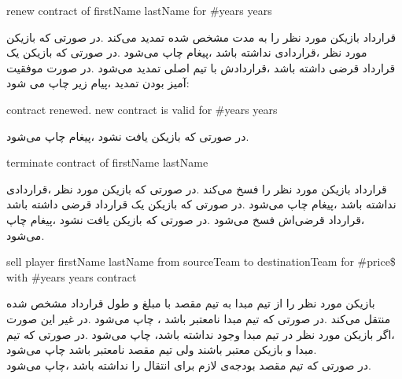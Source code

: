 \documentclass[]{article}
\begin{document}
\begin{tcolorbox}[boxrule=0pt]
	\begin{latin}
		\large{
			renew contract of firstName lastName for \#years years
		}
	\end{latin}
\end{tcolorbox}
ﻗﺮارداد ﺑﺎزﯾﮑﻦ ﻣﻮرد ﻧﻈﺮ را ﺑﻪ ﻣﺪت ﻣﺸﺨﺺ ﺷﺪه ﺗﻤﺪﯾﺪ ﻣﯽﮐﻨﺪ .‬در ﺻﻮرﺗﯽ ﮐﻪ 
ﺑﺎزﯾﮑﻦ ﻣﻮرد ﻧﻈﺮ ،‬ﻗﺮاردادی ﻧﺪاﺷﺘﻪ ﺑﺎﺷﺪ ،‬ﭘﯿﻐﺎم  
‬ﭼﺎپ ﻣﯽﺷﻮد .‬در ﺻﻮرﺗﯽ ﮐﻪ ﺑﺎزﯾﮑﻦ ﯾﮏ ﻗﺮارداد ﻗﺮﺿﯽ داﺷﺘﻪ ﺑﺎﺷﺪ ،‬ﻗﺮاردادش ﺑﺎ 
ﺗﯿﻢ اﺻﻠﯽ ﺗﻤﺪﯾﺪ ﻣﯽﺷﻮد .‬در ﺻﻮرت ﻣﻮﻓﻘﯿﺖ آﻣﯿﺰ ﺑﻮدن ﺗﻤﺪﯾﺪ ،‬ﭘﯿﺎم زﯾﺮ ﭼﺎپ ﻣﯽ 
ﺷﻮد:‬‬‬‬‬‬‬‬‬‬‬‬‬‬
\begin{tcolorbox}[boxrule=0pt]
	\begin{latin}
		\large{
			contract renewed. new contract is valid for \#years years‬‬‬‬
		}
	\end{latin}
\end{tcolorbox}
در ﺻﻮرﺗﯽ ﮐﻪ ﺑﺎزﯾﮑﻦ ﯾﺎﻓﺖ ﻧﺸﻮد ،‬ﭘﯿﻐﺎم  ‬ﭼﺎپ ﻣﯽﺷﻮد.‬‬‬‬‬‬

\hrulefill

\begin{tcolorbox}[boxrule=0pt]
	\begin{latin}
		\large{
			terminate contract of firstName lastName‬‬‬‬
		}
	\end{latin}
\end{tcolorbox}
ﻗﺮارداد ﺑﺎزﯾﮑﻦ ﻣﻮرد ﻧﻈﺮ را ﻓﺴﺦ ﻣﯽﮐﻨﺪ .‬در ﺻﻮرﺗﯽ ﮐﻪ ﺑﺎزﯾﮑﻦ ﻣﻮرد ﻧﻈﺮ 
،‬ﻗﺮاردادی ﻧﺪاﺷﺘﻪ ﺑﺎﺷﺪ ،‬ﭘﯿﻐﺎم  ‬ﭼﺎپ ﻣﯽﺷﻮد 
.‬در 
ﺻﻮرﺗﯽ ﮐﻪ ﺑﺎزﯾﮑﻦ ﯾﮏ ﻗﺮارداد ﻗﺮﺿﯽ داﺷﺘﻪ ﺑﺎﺷﺪ ،‬ﻗﺮارداد ﻗﺮﺿﯽاش ﻓﺴﺦ ﻣﯽﺷﻮد 
.‬در 
ﺻﻮرﺗﯽ ﮐﻪ ﺑﺎزﯾﮑﻦ ﯾﺎﻓﺖ ﻧﺸﻮد ،‬ﭘﯿﻐﺎم  ‬ﭼﺎپ ﻣﯽﺷﻮد.‬‬‬‬‬‬‬‬‬‬‬‬‬

\hrulefill

\begin{tcolorbox}[boxrule=0pt]
	\begin{latin}
		\large{
			sell player firstName lastName from sourceTeam to destinationTeam 
			for \#price\$ with‬‬‬‬ \#years years contract
			
		}
	\end{latin}
\end{tcolorbox}
ﺑﺎزﯾﮑﻦ ﻣﻮرد ﻧﻈﺮ را از ﺗﯿﻢ ﻣﺒﺪا ﺑﻪ ﺗﯿﻢ ﻣﻘﺼﺪ ﺑﺎ ﻣﺒﻠﻎ و ﻃﻮل ﻗﺮارداد ﻣﺸﺨﺺ 
ﺷﺪه ﻣﻨﺘﻘﻞ ﻣﯽﮐﻨﺪ .‬در ﺻﻮرﺗﯽ ﮐﻪ ﺗﯿﻢ ﻣﺒﺪا ﻧﺎﻣﻌﺘﺒﺮ ﺑﺎﺷﺪ
، ‬ﭼﺎپ ﻣﯽﺷﻮد .‬در ﻏﯿﺮ اﯾﻦ ﺻﻮرت ،‬اﮔﺮ ﺑﺎزﯾﮑﻦ ﻣﻮرد ﻧﻈﺮ در ﺗﯿﻢ ﻣﺒﺪا وﺟﻮد 
ﻧﺪاﺷﺘﻪ ﺑﺎﺷﺪ،‬‬‬‬‬‬‬‬‬
‬ﭼﺎپ ﻣﯽﺷﻮد .‬در ﺻﻮرﺗﯽ ﮐﻪ ﺗﯿﻢ ﻣﺒﺪا و ﺑﺎزﯾﮑﻦ ﻣﻌﺘﺒﺮ ﺑﺎﺷﻨﺪ وﻟﯽ ﺗﯿﻢ ﻣﻘﺼﺪ 
ﻧﺎﻣﻌﺘﺒﺮ باشد  چاپ ﻣﯽﺷﻮد.
\\
در ﺻﻮرﺗﯽ ﮐﻪ ﺗﯿﻢ ﻣﻘﺼﺪ ﺑﻮدﺟﻪی ﻻزم ﺑﺮای اﻧﺘﻘﺎل را ﻧﺪاﺷﺘﻪ ﺑﺎﺷﺪ 
،‬ﭼﺎپ ﻣﯽﺷﻮد.‬‬‬‬‬
\end{document}
